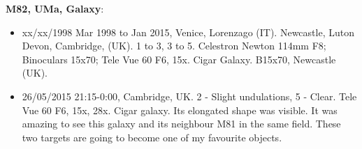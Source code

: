 {\bf M82, UMa, Galaxy}:
\begin{itemize}
\item xx/xx/1998 Mar 1998 to Jan 2015, Venice, Lorenzago (IT). Newcastle, Luton Devon, Cambridge, (UK). 1 to 3, 3 to 5. Celestron Newton 114mm F8; Binoculars 15x70; Tele Vue 60 F6, 15x. Cigar Galaxy. B15x70, Newcastle (UK).
\item 26/05/2015 21:15-0:00, Cambridge, UK. 2 - Slight undulations, 5 - Clear. Tele Vue 60 F6, 15x, 28x. Cigar galaxy. Its elongated shape was visible. It was amazing to see this galaxy and its neighbour M81 in the same field. These two targets are going to become one of my favourite objects.  
\end{itemize}
